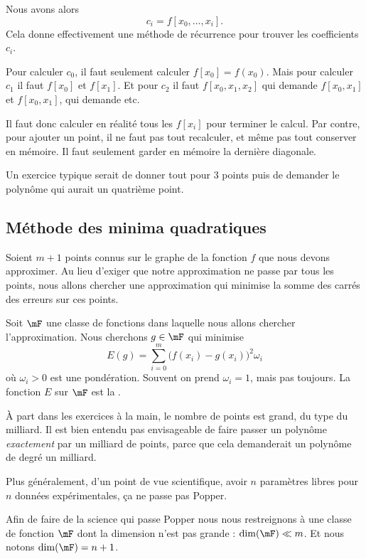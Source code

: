 Nous avons alors
\begin{equation}
    c_i=f[x_0,\ldots, x_i].
\end{equation}
Cela donne effectivement une méthode de récurrence pour trouver les coefficients \( c_i\).

\begin{remark}
    Pour calculer \( c_0\), il faut seulement calculer \( f[x_0]=f(x_0)\). Mais pour calculer \( c_1\) il faut \( f[x_0] \) et \( f[x_1]\). Et pour \( c_2\) il faut \( f[x_0,x_1,x_2]\) qui demande \( f[x_0,x_1]\) et \( f[x_0,x_1]\), qui demande etc.

    Il faut donc calculer en réalité tous les \( f[x_i]\) pour terminer le calcul. Par contre, pour ajouter un point, il ne faut pas tout recalculer, et même pas tout conserver en mémoire. Il faut seulement garder en mémoire la dernière diagonale.
\end{remark}


Un exercice typique serait de donner tout pour \( 3\) points puis de demander le polynôme qui aurait un quatrième point.

\subsection{Méthode des minima quadratiques}

Soient \( m+1\) points connus sur le graphe de la fonction \( f\) que nous devons approximer. Au lieu d'exiger que notre approximation ne passe par tous les points, nous allons chercher une approximation qui minimise la somme des carrés des erreurs sur ces points.

Soit \( \mF\) une classe de fonctions dans laquelle nous allons chercher l'approximation. Nous cherchons \( g\in \mF\) qui minimise
\begin{equation}    \label{EQooJGQVooKwZZVJ}
   E(g)= \sum_{i=0}^m \big( f(x_i)-g(x_i) \big)^2\omega_i
\end{equation}
où \( \omega_i>0\) est une pondération. Souvent on prend \( \omega_i=1\), mais pas toujours. La fonction \( E\) sur \( \mF\) est la .

\begin{normaltext}
    À part dans les exercices à la main, le nombre de points est grand, du type du milliard. Il est bien entendu pas envisageable de faire passer un polynôme \emph{exactement} par un milliard de points, parce que cela demanderait un polynôme de degré un milliard.

    Plus généralement, d'un point de vue scientifique, avoir \( n\) paramètres libres pour \( n\) données expérimentales, ça ne passe pas Popper.

    Afin de faire de la science qui passe Popper nous nous restreignons à une classe de fonction \( \mF\) dont la dimension n'est pas grande : \( \dim( \mF)\ll m\). Et nous notons \( \dim(\mF)=n+1\).
\end{normaltext}

